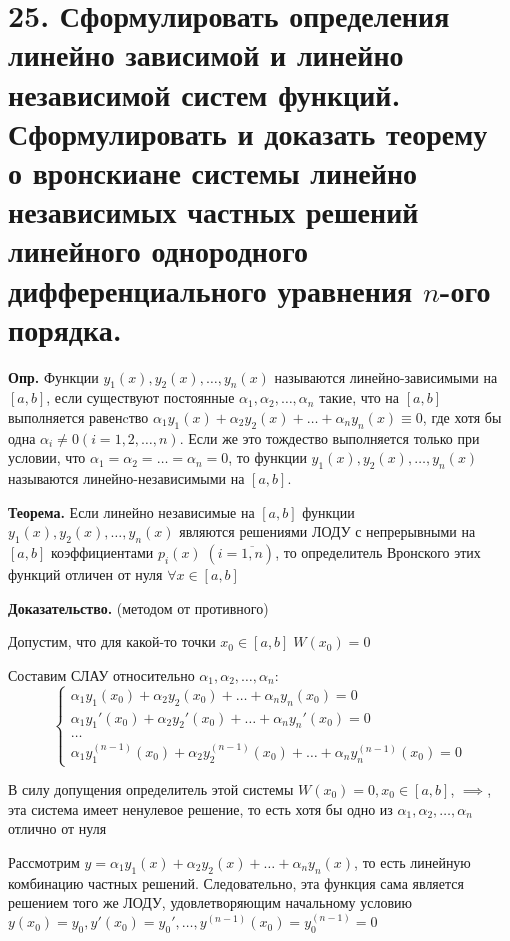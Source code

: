 \documentclass[11pt]{article}
\begin{document}
\section*{25. Сформулировать определения линейно зависимой и линейно независимой систем функций. Сформулировать и доказать теорему о вронскиане системы линейно независимых частных решений линейного однородного дифференциального уравнения $n$-ого порядка.}
\par\textbf{Опр.} Функции $y_{1}(x), y_{2}(x), \dots, y_{n}(x)$ называются линейно-зависимыми на $[a, b]$, если существуют постоянные $\alpha_{1}, \alpha_{2}, \dots, \alpha_{n}$ такие, что на $[a, b]$ выполняется равенcтво $\alpha_{1}y_{1}(x) + \alpha_{2}y_{2}(x) + \dots + \alpha_{n}y_{n}(x) \equiv 0$, где хотя бы одна $\alpha_{i} \neq 0(i = 1, 2, \dots, n)$. Если же это тождество выполняется только при условии, что $\alpha_{1} = \alpha_{2} = \dots = \alpha_{n} = 0$, то функции $y_{1}(x), y_{2}(x), \dots, y_{n}(x)$ называются линейно-независимыми на $[a, b]$.
\par\textbf{Теорема.} Если линейно независимые на $[a, b]$ функции $y_{1}(x), y_{2}(x), \dots, y_{n}(x)$ являются решениями ЛОДУ с непрерывными на $[a, b]$ коэффициентами $p_{i}(x) \; (i = \overline{1, n})$, то определитель Вронского этих функций отличен от нуля $\forall x \in [a, b]$
\par\textbf{Доказательство.} (методом от противного)
\par Допустим, что для какой-то точки $x_{0} \in [a, b] \; W(x_{0}) = 0$
\par Составим СЛАУ относительно $\alpha_{1}, \alpha_{2}, \dots, \alpha_{n}$:
$$\left\{\begin{array}{l}
\alpha_{1}y_{1}(x_{0}) + \alpha_{2}y_{2}(x_{0}) + \dots + \alpha_{n}y_{n}(x_{0}) = 0 \\
\alpha_{1}y_{1}'(x_{0}) + \alpha_{2}y_{2}'(x_{0}) + \dots + \alpha_{n}y_{n}'(x_{0}) = 0 \\
\dots \\
\alpha_{1}y_{1}^{(n-1)}(x_{0}) + \alpha_{2}y_{2}^{(n-1)}(x_{0}) + \dots + \alpha_{n}y_{n}^{(n-1)}(x_{0}) = 0
\end{array}\right.$$
\par В силу допущения определитель этой системы $W(x_0) = 0, x_{0} \in [a, b]$, $\implies$, эта система имеет ненулевое решение, то есть хотя бы одно из $\alpha_{1}, \alpha_{2}, \dots, \alpha_{n}$ отлично от нуля
\par Рассмотрим $y = \alpha_{1}y_{1}(x) + \alpha_{2}y_{2}(x) + \dots + \alpha_{n}y_{n}(x)$, то есть линейную комбинацию частных решений. Следовательно, эта функция сама является решением того же ЛОДУ, удовлетворяющим начальному условию $y(x_{0}) = y_{0}, y'(x_{0}) = y_{0}', \dots, y^{(n-1)}(x_{0}) = y_{0}^{(n-1)} = 0$
\end{document}
